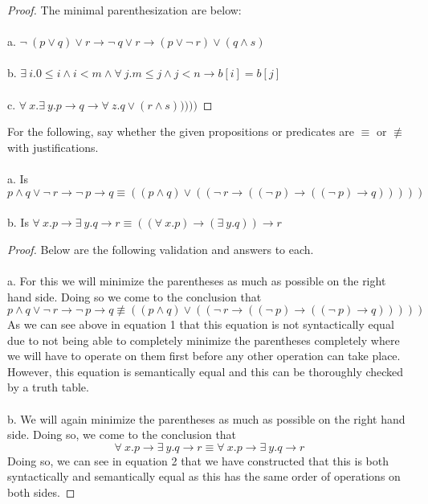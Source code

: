 \documentclass[12pt]{article}
\newenvironment{exercise}[2][Exercise]{\begin{trivlist}
\item[\hskip \labelsep {\bfseries #1}\hskip \labelsep {\bfseries #2.}]}{\end{trivlist}}
\begin{document}
\begin{proof}
The minimal parenthesization are below: \\ \\
a. $\neg\: (p \lor q) \lor r \rightarrow  \neg\: q \lor r \rightarrow (p \lor \neg\: r) \lor (q \land s)$\\ \\ 
b. $\exists\: i.0 \leq i \land i < m \land \forall\: j. m \leq j \land j < n \rightarrow b[i] = b[j]$\\ \\
c. $\forall\: x. \exists\: y.p \rightarrow q \rightarrow \forall\: z.q \lor (r \land s)))))$
\end{proof}

\begin{exercise}{3}
For the following, say whether the given propositions or predicates are $\equiv$ or $\not\equiv$ with justifications. \\ \\
a. Is $p \land q \lor \neg\: r \rightarrow \neg\: p \rightarrow q \equiv (( p \land q) \lor ((\neg\: r \rightarrow (( \neg\: p) \rightarrow (( \neg\: p) \rightarrow q)))))$ \\ \\
b. Is $\forall\: x.p \rightarrow \exists\: y.q \rightarrow r \equiv (( \forall\: x.p) \rightarrow (\exists\: y.q)) \rightarrow r$
\end{exercise}

\begin{proof}
Below are the following validation and answers to each.
\\ \\
a. For this we will minimize the parentheses as much as possible on the right hand side. Doing so we come to the conclusion that
\begin{equation}
    p \land q \lor \neg\: r \rightarrow \neg\: p \rightarrow q \not\equiv (( p \land q) \lor ((\neg\: r \rightarrow (( \neg\: p) \rightarrow (( \neg\: p) \rightarrow q)))))
\end{equation}
As we can see above in equation 1 that this equation is not syntactically equal due to not being able to completely minimize the parentheses completely where we will have to operate on them first before any other operation can take place. However, this equation is semantically equal and this can be thoroughly checked by a truth table. \\ \\
b. We will again minimize the parentheses as much as possible on the right hand side. Doing so, we come to the conclusion that
\begin{equation}
    \forall\: x.p \rightarrow \exists\: y.q \rightarrow r \equiv \forall\: x.p \rightarrow \exists\: y.q \rightarrow r
\end{equation}
Doing so, we can see in equation 2 that we have constructed that this is both syntactically and semantically equal as this has the same order of operations on both sides.

\end{proof}
 
\end{document}

